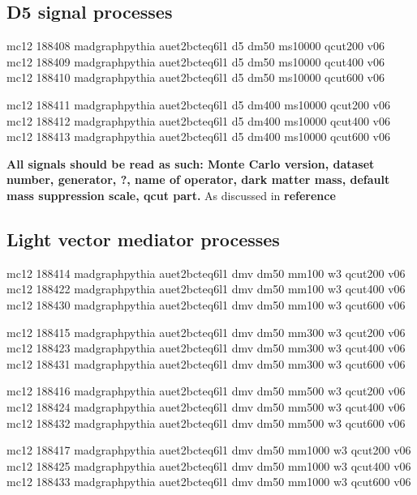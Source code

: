 \subsection{D5 signal processes}
mc12 188408 madgraphpythia  auet2bcteq6l1  d5  dm50  ms10000  qcut200 v06\\
mc12 188409 madgraphpythia  auet2bcteq6l1  d5  dm50  ms10000  qcut400 v06\\
mc12 188410 madgraphpythia  auet2bcteq6l1  d5  dm50  ms10000  qcut600 v06

mc12 188411 madgraphpythia  auet2bcteq6l1  d5  dm400  ms10000  qcut200 v06\\
mc12 188412 madgraphpythia  auet2bcteq6l1  d5  dm400  ms10000  qcut400 v06\\
mc12 188413 madgraphpythia  auet2bcteq6l1  d5  dm400  ms10000  qcut600 v06

\textbf{All signals should be read as such: Monte Carlo version, dataset number, generator, ?, name of operator,  dark matter mass, default mass suppression scale, qcut part.} As discussed in \textbf{reference} 
\subsection{Light vector mediator processes}
mc12 188414 madgraphpythia auet2bcteq6l1 dmv dm50 mm100 w3 qcut200 v06\\ mc12 188422 madgraphpythia auet2bcteq6l1 dmv dm50 mm100 w3 qcut400 v06\\
mc12 188430 madgraphpythia auet2bcteq6l1 dmv dm50 mm100 w3 qcut600 v06
 
mc12 188415 madgraphpythia auet2bcteq6l1 dmv dm50 mm300 w3 qcut200 v06\\
mc12 188423 madgraphpythia auet2bcteq6l1 dmv dm50 mm300 w3 qcut400 v06\\
mc12 188431 madgraphpythia auet2bcteq6l1 dmv dm50 mm300 w3 qcut600 v06

mc12 188416 madgraphpythia auet2bcteq6l1 dmv dm50 mm500 w3 qcut200 v06\\
mc12 188424 madgraphpythia auet2bcteq6l1 dmv dm50 mm500 w3 qcut400 v06\\
mc12 188432 madgraphpythia auet2bcteq6l1 dmv dm50 mm500 w3 qcut600 v06

mc12 188417 madgraphpythia auet2bcteq6l1 dmv dm50 mm1000 w3 qcut200 v06\\
mc12 188425 madgraphpythia auet2bcteq6l1 dmv dm50 mm1000 w3 qcut400 v06\\
mc12 188433 madgraphpythia auet2bcteq6l1 dmv dm50 mm1000 w3 qcut600 v06

